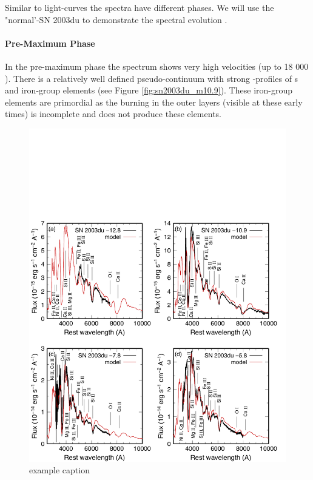 Similar to light-curves the spectra have different phases. We will use the "normal'-\snia SN 2003du to demonstrate the spectral evolution \citep{2011MNRAS.410.1725T}. 
\paragraph{Pre-Maximum Phase}
In the pre-maximum phase the spectrum shows very high velocities (up to 18 000 \kms). There is a relatively well defined pseudo-continuum with strong \pcygni-profiles of \ime s and iron-group elements (see Figure \ref{fig:sn2003du_m10.9}). These iron-group elements are primordial as the burning in the outer layers (visible at these early times) is incomplete and does not produce these elements. 
\begin{figure}[htbp] %
   \centering
   \includegraphics[width=\textwidth]{chapter_intro/plots/sn2003du_t-10.pdf} 
   \caption{example caption}
   \label{fig:sn2003du_t-10}
\end{figure}

